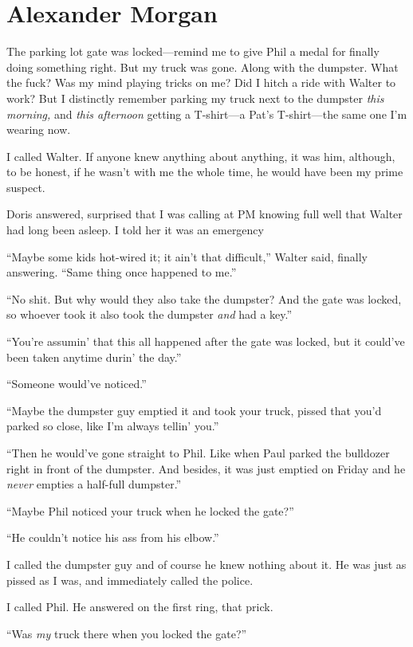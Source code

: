 \chapter{Alexander Morgan}

\titlemark

The parking lot gate was locked---remind me to give Phil a medal for
finally doing something right. But my truck was gone. Along with the
dumpster. What the fuck? Was my mind playing tricks on me? Did I hitch a
ride with Walter to work? But I distinctly remember parking my truck
next to the dumpster \emph{this morning,} and \emph{this afternoon}
getting a T-shirt---a Pat's T-shirt---the same one I'm wearing now.

I called Walter. If anyone knew anything about anything, it was him,
although, to be honest, if he wasn't with me the whole time, he would
have been my prime suspect.

Doris answered, surprised that I was calling at  PM knowing full
well that Walter had long been asleep. I told her it was an emergency

``Maybe some kids hot-wired it; it ain't that difficult,'' Walter said,
finally answering. ``Same thing once happened to me.''

``No shit. But why would they also take the dumpster? And the gate was
locked, so whoever took it also took the dumpster \emph{and} had a
key.''

``You're assumin' that this all happened after the gate was locked, but
it could've been taken anytime durin' the day.''

``Someone would've noticed.''

``Maybe the dumpster guy emptied it and took your truck, pissed that
you'd parked so close, like I'm always tellin' you.''

``Then he would've gone straight to Phil. Like when Paul parked the
bulldozer right in front of the dumpster. And besides, it was just
emptied on Friday and he \emph{never} empties a half-full dumpster.''

``Maybe Phil noticed your truck when he locked the gate?''

``He couldn't notice his ass from his elbow.''

I called the dumpster guy and of course he knew nothing about it. He was
just as pissed as I was, and immediately called the police.

I called Phil. He answered on the first ring, that prick.

``Was \emph{my} truck there when you locked the gate?''

